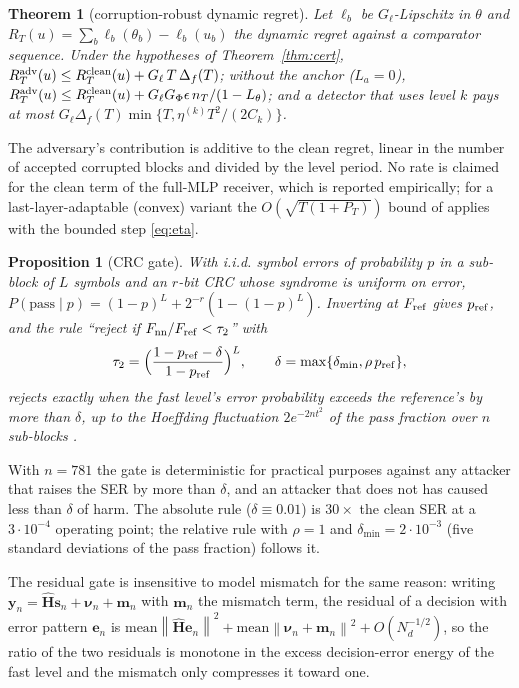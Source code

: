 \documentclass[journal]{IEEEtran}
\newtheorem{theorem}{Theorem}
\newtheorem{proposition}{Proposition}
\newcommand{\norm}[1]{\left\lVert #1 \right\rVert}
\begin{document}
\begin{theorem}[corruption-robust dynamic regret]\label{thm:regret}
Let $\ell_b$ be $G_\ell$-Lipschitz in $\theta$ and $R_T(u)=\sum_b\ell_b(\theta_b)-\ell_b(u_b)$
the dynamic regret against a comparator sequence. Under the hypotheses of
Theorem~\ref{thm:cert}, $R^{\rm adv}_T(u)\le R^{\rm clean}_T(u)+G_\ell\,T\,\Delta_f(T)$; without
the anchor ($L_a=0$), $R^{\rm adv}_T(u)\le R^{\rm clean}_T(u)+G_\ell G_\Phi\epsilon\,n_T/(1-L_\theta)$;
and a detector that uses level $k$ pays at most
$G_\ell\Delta_f(T)\min\{T,\eta^{(k)}T^2/(2C_k)\}$.
\end{theorem}
The adversary's contribution is additive to the clean regret, linear in the number of
accepted corrupted blocks and divided by the level period. No rate is claimed for the
clean term of the full-MLP receiver, which is reported empirically; for a
last-layer-adaptable (convex) variant the $O(\sqrt{T(1+P_T)})$ bound of
\cite{zinkevich2003,mokhtari2016} applies with the bounded step \eqref{eq:eta}.

\begin{proposition}[CRC gate]\label{prop:crc}
With i.i.d. symbol errors of probability $p$ in a sub-block of $L$ symbols and an $r$-bit
CRC whose syndrome is uniform on error, $P(\mathrm{pass}\mid p)=(1-p)^L+2^{-r}(1-(1-p)^L)$.
Inverting at $F_{\rm ref}$ gives $p_{\rm ref}$, and the rule ``reject if $F_{\rm nn}/F_{\rm
ref}<\tau_2$'' with
\begin{equation}\label{eq:tau2}
\tau_2=\Big(\frac{1-p_{\rm ref}-\delta}{1-p_{\rm ref}}\Big)^{L},\qquad\delta=\max\{\delta_{\min},\rho\,p_{\rm ref}\},
\end{equation}
rejects exactly when the fast level's error probability exceeds the reference's by more
than $\delta$, up to the Hoeffding fluctuation $2e^{-2nt^2}$ of the pass fraction over $n$
sub-blocks \cite{hoeffding1963}.
\end{proposition}
With $n=781$ the gate is deterministic for practical purposes against any attacker that
raises the SER by more than $\delta$, and an attacker that does not has caused less than
$\delta$ of harm. The absolute rule ($\delta\equiv0.01$) is $30\times$ the clean SER at a
$3\cdot10^{-4}$ operating point; the relative rule with $\rho=1$ and
$\delta_{\min}=2\cdot10^{-3}$ (five standard deviations of the pass fraction) follows it.

The residual gate is insensitive to model mismatch for the same reason: writing $\bm
y_n=\hat{\bm H}\bm s_n+\bm\nu_n+\bm m_n$ with $\bm m_n$ the mismatch term, the residual of a
decision with error pattern $\bm e_n$ is $\mathrm{mean}\norm{\hat{\bm
H}\bm e_n}^2+\mathrm{mean}\norm{\bm\nu_n+\bm m_n}^2+O(N_d^{-1/2})$, so the ratio of the two
residuals is monotone in the excess decision-error energy of the fast level and the
mismatch only compresses it toward one.
\end{document}
